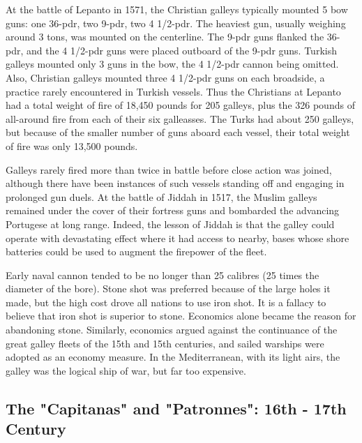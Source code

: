 \documentclass{article}
\begin{document}
\begin{multicols}{3}
At the battle of Lepanto in 1571, the Christian galleys typically
mounted 5 bow guns: one 36-pdr, two 9-pdr, two 4 1/2-pdr.  The
heaviest gun, usually weighing around 3 tons, was mounted on the
centerline. The 9-pdr guns flanked the 36-pdr, and the 4 1/2-pdr guns
were placed outboard of the 9-pdr guns.  Turkish galleys mounted only
3 guns in the bow, the 4 1/2-pdr cannon being omitted.  Also,
Christian galleys mounted three 4 1/2-pdr guns on each broadside, a
practice rarely encountered in Turkish vessels.  Thus the Christians
at Lepanto had a total weight of fire of 18,450 pounds for 205
galleys, plus the 326 pounds of all-around fire from each of their six
galleasses.  The Turks had about 250 galleys, but because of the
smaller number of guns aboard each vessel, their total weight of fire
was only 13,500 pounds.

Galleys rarely fired more than twice in battle before close action was
joined, although there have been instances of such vessels standing
off and engaging in prolonged gun duels.  At the battle of Jiddah in
1517, the Muslim galleys remained under the cover of their fortress
guns and bombarded the advancing Portugese at long range.  Indeed, the
lesson of Jiddah is that the galley could operate with devastating
effect where it had access to nearby, bases whose shore batteries
could be used to augment the firepower of the fleet.

Early naval cannon tended to be no longer than 25 calibres (25 times
the diameter of the bore).  Stone shot was preferred because of the
large holes it made, but the high cost drove all nations to use iron
shot.  It is a fallacy to believe that iron shot is superior to stone.
Economics alone became the reason for abandoning stone.  Similarly,
economics argued against the continuance of the great galley fleets of
the 15th and 15th centuries, and sailed warships were adopted as an
economy measure. In the Mediterranean, with its light airs, the galley
was the logical ship of war, but far too expensive.

\subsection{The "Capitanas" and "Patronnes":  16th - 17th Century}


\end{multicols}
\end{document}
